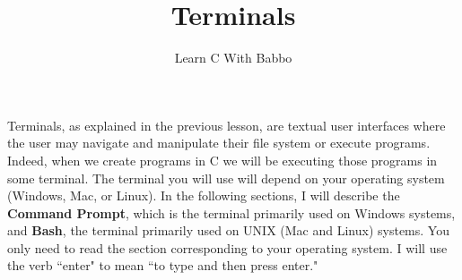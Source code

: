 \documentclass{article}
\begin{document}
\title{Terminals}
\author{Learn C With Babbo}
\date{}
\maketitle
\section*{}
Terminals, as explained in the previous lesson, are textual user interfaces where the user may navigate and manipulate
their file system or execute programs. Indeed, when we create programs in C we will be executing those programs in some
terminal. The terminal you will use will depend on your operating system (Windows, Mac, or Linux). In the following 
sections, I will describe the
\textbf{Command Prompt}, which is the terminal primarily used on Windows systems, and \textbf{Bash}, the terminal
primarily used on UNIX (Mac and Linux) systems. You only need to read the section corresponding to your operating 
system. I will use the verb ``enter" to mean ``to type and then press enter."
\end{document}
